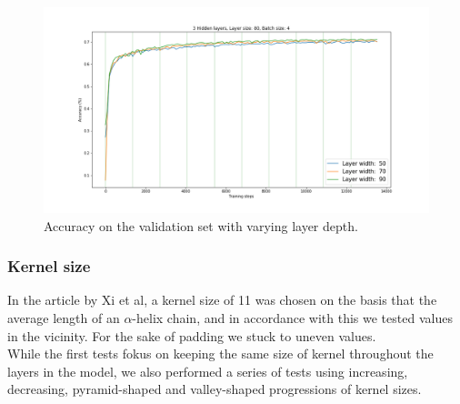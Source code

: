 \begin{figure}[H]
  \centering
  \includegraphics[width=\linewidth]{../graphs/new/layer_width_1}
  \caption{Accuracy on the validation set with varying layer depth.}
\end{figure}
\subsubsection{Kernel size}
In the article by Xi et al, a kernel size of 11 was chosen on the basis that the average length of an $\alpha$-helix chain, and in accordance with this we tested values in the vicinity. For the sake of padding we stuck to uneven values.\\
While the first tests fokus on keeping the same size of kernel throughout the layers in the model, we also performed a series of tests using increasing, decreasing, pyramid-shaped and valley-shaped progressions of kernel sizes.

